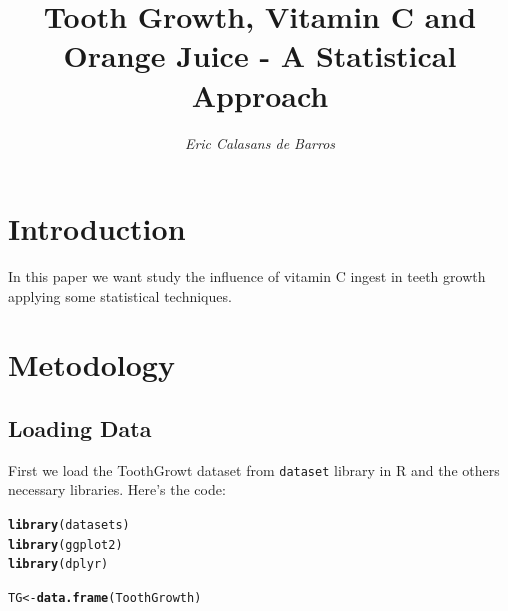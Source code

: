 \documentclass[a4paper, 12pt]{article}\usepackage[]{graphicx}\usepackage[]{color}
\title{\textbf{Tooth Growth, Vitamin C and Orange Juice - A Statistical Approach}}
\author{\textit{Eric Calasans de Barros}}
\makeatletter
\newcommand{\hlstd}[1]{\textcolor[rgb]{0.345,0.345,0.345}{#1}}%
\newcommand{\hlkwb}[1]{\textcolor[rgb]{0.69,0.353,0.396}{#1}}%
\newcommand{\hlkwd}[1]{\textcolor[rgb]{0.737,0.353,0.396}{\textbf{#1}}}%
\newenvironment{kframe}{%
 \def\at@end@of@kframe{}%
 \ifinner\ifhmode%
  \def\at@end@of@kframe{\end{minipage}}%
  \begin{minipage}{\columnwidth}%
 \fi\fi%
 \def\FrameCommand##1{\hskip\@totalleftmargin \hskip-\fboxsep
 \colorbox{shadecolor}{##1}\hskip-\fboxsep
     \hskip-\linewidth \hskip-\@totalleftmargin \hskip\columnwidth}%
 \MakeFramed {\advance\hsize-\width
   \@totalleftmargin\z@ \linewidth\hsize
   \@setminipage}}%
 {\par\unskip\endMakeFramed%
 \at@end@of@kframe}
\newenvironment{knitrout}{}{} %
\makeatother
\begin{document}
        \section{Introduction}
        In this paper we want study the influence of vitamin C ingest in teeth growth applying some statistical techniques.
        
        \section{Metodology}
        \subsection{Loading Data}
        First we load the ToothGrowt dataset from \texttt{dataset} library in R and the others necessary libraries.  Here's the code:
\begin{knitrout}\small
{}\color{fgcolor}\begin{kframe}
\begin{alltt}
\hlkwd{library}\hlstd{(datasets)}
\hlkwd{library}\hlstd{(ggplot2)}
\hlkwd{library}\hlstd{(dplyr)}
\end{alltt}


{\ttfamily\noindent\color{warningcolor}{\#\# Warning: package 'dplyr' was built under R version 3.4.2}}\begin{alltt}
\hlstd{TG} \hlkwb{<-} \hlkwd{data.frame}\hlstd{(ToothGrowth)}
\end{alltt}
\end{kframe}
\end{knitrout}
\end{document}
